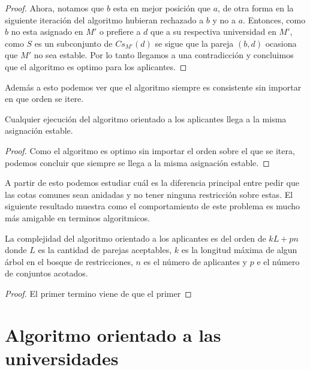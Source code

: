 \begin{proof}
Ahora, notamos que $b$ esta en mejor posición que $a$, de otra forma en la siguiente iteración del algoritmo hubieran rechazado a $b$ y no a $a$. Entonces, como $b$ no esta asignado en $M'$ o prefiere a $d$ que a su respectiva universidad en $M'$, como $S$ es un subconjunto de  $Cs_{M'}(d)$ se sigue que la pareja $(b,d)$ ocasiona que $M'$ no sea estable. Por lo tanto llegamos a una contradicción y concluimos que el algoritmo es optimo para los aplicantes. 
\end{proof}

Además a esto podemos ver que el algoritmo siempre es consistente sin importar en que orden se itere. 

\begin{cor}
Cualquier ejecución del algoritmo orientado a los aplicantes llega a la misma asignación estable. 
\end{cor}
\begin{proof}
Como el algoritmo es optimo sin importar el orden sobre el que se itera, podemos concluir que siempre se llega a la misma asignación estable.
\end{proof}

A partir de esto podemos estudiar cuál es la diferencia principal entre pedir que las cotas comunes sean anidadas y no tener ninguna restricción sobre estas. El siguiente resultado muestra como el comportamiento de este problema es mucho más amigable en terminos algoritmicos. 

\begin{teo}
La complejidad del algoritmo orientado a los aplicantes es del orden de $kL+pn$ donde $L$ es la cantidad de parejas aceptables, $k$ es la longitud máxima de algun árbol en el bosque de restricciones, $n$ es el número de aplicantes y $p$ e el número de conjuntos acotados. 
\end{teo}
\begin{proof}
El primer termino viene de que el primer %
\end{proof}


\section{Algoritmo orientado a las universidades}

